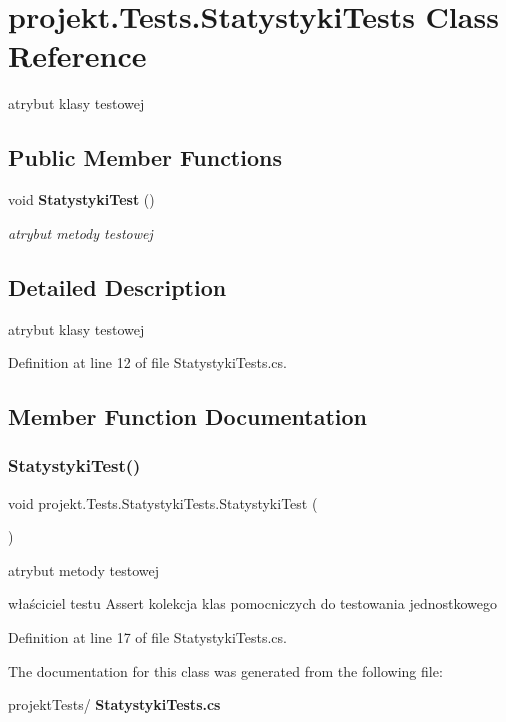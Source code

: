 \section{projekt.\+Tests.\+Statystyki\+Tests Class Reference}
\label{classprojekt_1_1Tests_1_1StatystykiTests}


atrybut klasy testowej  


\subsection*{Public Member Functions}
\begin{DoxyCompactItemize}
\item 
void \textbf{ Statystyki\+Test} ()
\begin{DoxyCompactList}\small\item\em atrybut metody testowej \end{DoxyCompactList}\end{DoxyCompactItemize}


\subsection{Detailed Description}
atrybut klasy testowej 

Definition at line 12 of file Statystyki\+Tests.\+cs.



\subsection{Member Function Documentation}
\mbox{\label{classprojekt_1_1Tests_1_1StatystykiTests_a73c12d240c051a37e71775979940f5dc}} 
\subsubsection{Statystyki\+Test()}
{\footnotesize\ttfamily void projekt.\+Tests.\+Statystyki\+Tests.\+Statystyki\+Test (\begin{DoxyParamCaption}{ }\end{DoxyParamCaption})\hspace{0.3cm}{\ttfamily [inline]}}



atrybut metody testowej 

właściciel testu Assert kolekcja klas pomocniczych do testowania jednostkowego 

Definition at line 17 of file Statystyki\+Tests.\+cs.



The documentation for this class was generated from the following file\+:\begin{DoxyCompactItemize}
\item 
projekt\+Tests/\textbf{ Statystyki\+Tests.\+cs}\end{DoxyCompactItemize}
